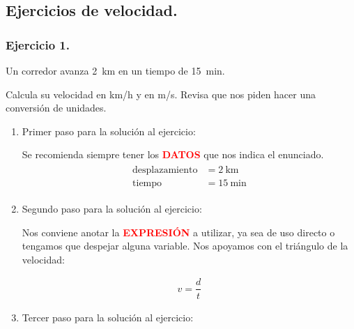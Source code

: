 \documentclass[14pt]{extarticle}
\newcommand{\textocolor}[2]{\textbf{\textcolor{#1}{#2}}}
\begin{document}
\subsection{Ejercicios de velocidad.}

\subsubsection{Ejercicio 1.}

Un corredor avanza \SI{2}{\kilo\meter} en un tiempo de \SI{15}{\minute}.

\vspace*{0.5cm}
Calcula su velocidad en \unit[per-mode=symbol]{\kilo\meter\per\hour} y en \unit[per-mode=symbol]{\meter\per\second}. Revisa que nos piden hacer una conversión de unidades.

\begin{enumerate}
\item Primer paso para la solución al ejercicio:

Se recomienda siempre tener los \textocolor{red}{DATOS} que nos indica el enunciado.
\begin{eqnarray*}
\begin{aligned}
\text{desplazamiento} &= \SI{2}{\kilo\meter} \\[0.5em] 
\text{tiempo} &= \SI{15}{\minute}
\end{aligned}
\end{eqnarray*}
\item Segundo paso para la solución al ejercicio:

Nos conviene anotar la \textocolor{red}{EXPRESIÓN} a utilizar, ya sea de uso directo o tengamos que despejar alguna variable.  Nos apoyamos con el triángulo de la velocidad:
\begin{minipage}{0.4\linewidth}
\begin{figure}[H]
\centering
{}
\end{figure}
\end{minipage}
\hspace{0.5cm}
\begin{minipage}{0.4\linewidth}
\begin{align*}
v = \dfrac{d}{t}
\end{align*}
\end{minipage}
\item Tercer paso para la solución al ejercicio:


\end{enumerate}
\end{document}
